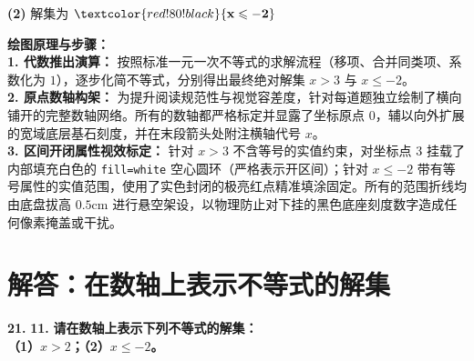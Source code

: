 \documentclass[12pt, a4paper]{ctexrep}
\begin{document}
\vspace{0.6cm}
\noindent \textbf{(2)} 解集为 $\textcolor{red!80!black}{\mathbf{x \leqslant -2}}$ \par\vspace{0.2cm}
\begin{center}
\end{center}

\vspace{0.4cm}
{\small\color{blue!70!black}
\textbf{绘图原理与步骤：}\\
\textbf{1. 代数推出演算：} 按照标准一元一次不等式的求解流程（移项、合并同类项、系数化为 $1$），逐步化简不等式，分别得出最终绝对解集 $x > 3$ 与 $x \leqslant -2$。\\
\textbf{2. 原点数轴构架：} 为提升阅读规范性与视觉容差度，针对每道题独立绘制了横向铺开的完整数轴网络。所有的数轴都严格标定并显露了坐标原点 $0$，辅以向外扩展的宽域底层基石刻度，并在末段箭头处附注横轴代号 $x$。\\
\textbf{3. 区间开闭属性视效标定：} 针对 $x > 3$ 不含等号的实值约束，对坐标点 $3$ 挂载了内部填充白色的 \texttt{fill=white} 空心圆环（严格表示开区间）；针对 $x \leqslant -2$ 带有等号属性的实值范围，使用了实色封闭的极亮红点精准填涂固定。所有的范围折线均由底盘拔高 $0.5\mathrm{cm}$ 进行悬空架设，以物理防止对下挂的黑色底座刻度数字造成任何像素掩盖或干扰。
}

\newpage

\section{解答：在数轴上表示不等式的解集}

\vspace{0.6cm}

\textbf{\LARGE 21.} \textbf{\color{cyan!80!blue} 11. }\textbf{请在数轴上表示下列不等式的解集：\\
（1）$x > 2$；\hspace{4cm}（2）$x \leqslant -2$。}
\end{document}
